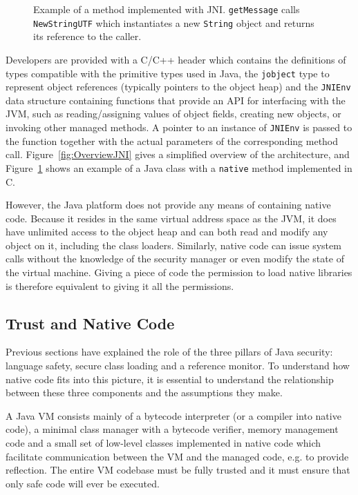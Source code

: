 \documentclass[a4paper,12pt,twoside,openright]{report}
\begin{document}
\begin{figure}[t]
	
	
	\caption{Example of a method implemented with JNI. \texttt{getMessage} calls \texttt{NewStringUTF} which instantiates a new \texttt{String} object and returns its reference to the caller.}
	\label{listing:HelloJNI}
\end{figure}

Developers are provided with a C/C++ header which contains the definitions of types compatible with the primitive types used in Java, the \texttt{jobject} type to represent object references (typically pointers to the object heap) and the \texttt{JNIEnv} data structure containing functions that provide an API for interfacing with the JVM, such as reading/assigning values of object fields, creating new objects, or invoking other managed methods. A pointer to an instance of \texttt{JNIEnv} is passed to the function together with the actual parameters of the corresponding method call. Figure~\ref{fig:OverviewJNI} gives a simplified overview of the architecture, and Figure~\ref{listing:HelloJNI} shows an example of a Java class with a \texttt{native} method implemented in C.

However, the Java platform does not provide any means of containing native code. Because it resides in the same virtual address space as the JVM, it does have unlimited access to the object heap and can both read and modify any object on it, including the class loaders. Similarly, native code can issue system calls without the knowledge of the security manager or even modify the state of the virtual machine. Giving a piece of code the permission to load native libraries is therefore equivalent to giving it all the permissions.

\subsection{Trust and Native Code}

Previous sections have explained the role of the three pillars of Java security: language safety, secure class loading and a reference monitor. To understand how native code fits into this picture, it is essential to understand the relationship between these three components and the assumptions they make.

A Java VM consists mainly of a bytecode interpreter (or a compiler into native code), a minimal class manager with a bytecode verifier, memory management code and a small set of low-level classes implemented in native code which facilitate communication between the VM and the managed code, e.g. to provide reflection. The entire VM codebase must be fully trusted and it must ensure that only safe code will ever be executed.
\end{document}
